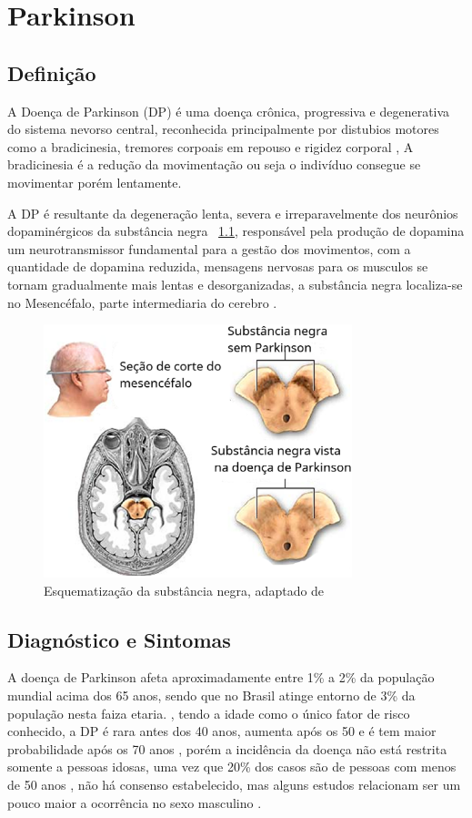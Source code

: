 \chapter{Parkinson}
\section{Definição}

A Doença de Parkinson (DP) é uma doença crônica, progressiva e degenerativa do sistema nevorso central, reconhecida principalmente por distubios motores como a bradicinesia, tremores corpoais em repouso e rigidez corporal \cite{da2016aspectos}, A bradicinesia é a redução da movimentação ou seja o indivíduo consegue se movimentar porém lentamente. 

A DP é resultante da degeneração lenta, severa e irreparavelmente dos neurônios dopaminérgicos da substância negra ~\ref{substanciaNegra}, responsável pela produção de dopamina um neurotransmissor fundamental para a gestão dos movimentos, com a quantidade de dopamina reduzida, mensagens nervosas para os musculos se tornam gradualmente mais lentas e desorganizadas, a substância negra localiza-se no Mesencéfalo, parte intermediaria do cerebro \cite{eftaxias2015detection}.

\begin{figure}[!htb]
	\centering
	\includegraphics[width=0.8\textwidth]{figuras/subNegra.eps}
	\caption{Esquematização da substância negra, adaptado de }
	\label{substanciaNegra}
\end{figure}

\section{Diagnóstico e Sintomas}
A doença de Parkinson afeta aproximadamente entre 1\% a 2\% da população mundial acima dos 65 anos, sendo que no Brasil atinge entorno de 3\% da população nesta faiza etaria. \cite{magalhaes2009descobrindo}, tendo a idade como o único fator de risco conhecido, a DP é rara antes dos 40 anos, aumenta após os 50 e é tem maior probabilidade após os 70 anos \cite{peixinho2006alteraccoes}, porém a incidência da doença não está restrita somente a pessoas idosas, uma vez que 20\% dos casos são de pessoas com menos de 50 anos \cite{gago2014manual}, não há consenso estabelecido, mas alguns estudos relacionam ser um pouco maior a ocorrência no sexo masculino \cite{peixinho2006alteraccoes}.

